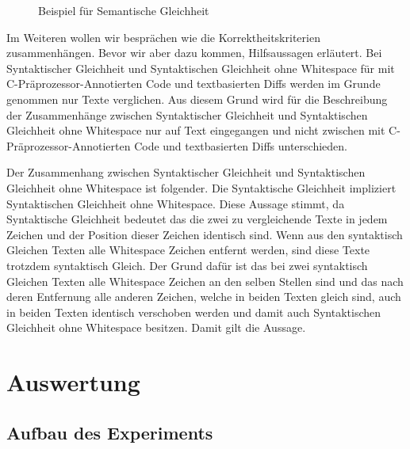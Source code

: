 \begin{figure}[H]
	\caption{Beispiel für Semantische Gleichheit }
\end{figure}


Im Weiteren wollen wir besprächen wie die Korrektheitskriterien zusammenhängen. Bevor wir aber dazu kommen, Hilfsaussagen erläutert. Bei Syntaktischer Gleichheit und Syntaktischen Gleichheit ohne Whitespace für mit C-Präprozessor-Annotierten Code und textbasierten Diffs werden im Grunde genommen nur Texte verglichen. Aus diesem Grund wird für die Beschreibung der Zusammenhänge zwischen Syntaktischer Gleichheit und Syntaktischen Gleichheit ohne Whitespace nur auf Text eingegangen und nicht zwischen mit C-Präprozessor-Annotierten Code und textbasierten Diffs unterschieden.

Der Zusammenhang zwischen Syntaktischer Gleichheit und Syntaktischen Gleichheit ohne Whitespace ist folgender. Die Syntaktische Gleichheit impliziert Syntaktischen Gleichheit ohne Whitespace. Diese Aussage stimmt, da Syntaktische Gleichheit bedeutet das die zwei zu vergleichende Texte in jedem Zeichen und der Position dieser Zeichen identisch sind. Wenn aus den syntaktisch Gleichen Texten alle Whitespace Zeichen entfernt werden, sind diese Texte trotzdem syntaktisch Gleich. Der Grund dafür ist das bei zwei syntaktisch Gleichen Texten alle Whitespace Zeichen an den selben Stellen sind und das nach deren Entfernung alle anderen Zeichen, welche in beiden Texten gleich sind, auch in beiden Texten identisch verschoben werden und damit auch Syntaktischen Gleichheit ohne Whitespace besitzen. Damit gilt die Aussage.

\section{Auswertung}


\subsection{Aufbau des Experiments}


